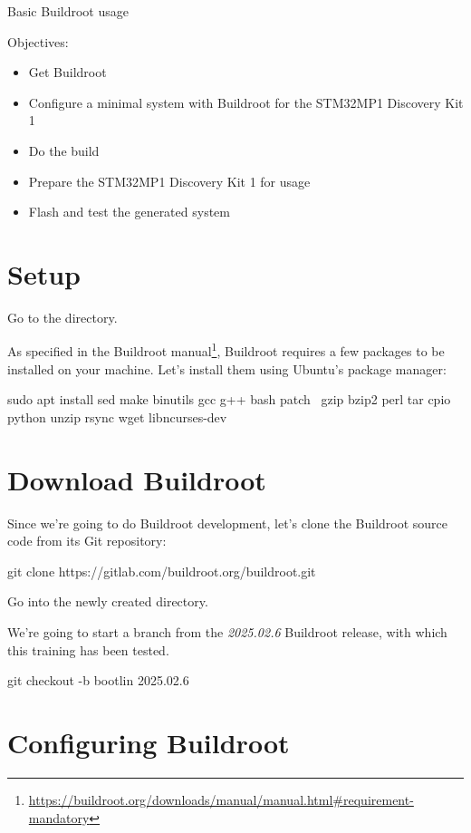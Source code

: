 \subchapter
{Basic Buildroot usage}
{Objectives:
  \begin{itemize}
  \item Get Buildroot
  \item Configure a minimal system with Buildroot for the STM32MP1 Discovery Kit 1
  \item Do the build
  \item Prepare the STM32MP1 Discovery Kit 1 for usage
  \item Flash and test the generated system
  \end{itemize}
}

\section{Setup}

Go to the  directory.

As specified in the Buildroot
manual\footnote{\url{https://buildroot.org/downloads/manual/manual.html\#requirement-mandatory}},
Buildroot requires a few packages to be installed on your
machine. Let's install them using Ubuntu's package manager:

\begin{bashinput}
sudo apt install sed make binutils gcc g++ bash patch \
  gzip bzip2 perl tar cpio python unzip rsync wget libncurses-dev
\end{bashinput}

\section{Download Buildroot}

Since we're going to do Buildroot development, let's clone the
Buildroot source code from its Git repository:

\begin{bashinput}
git clone https://gitlab.com/buildroot.org/buildroot.git
\end{bashinput}

Go into the newly created  directory.

We're going to start a branch from the {\em 2025.02.6} Buildroot
release, with which this training has been tested.

\begin{bashinput}
git checkout -b bootlin 2025.02.6
\end{bashinput}

\section{Configuring Buildroot}

